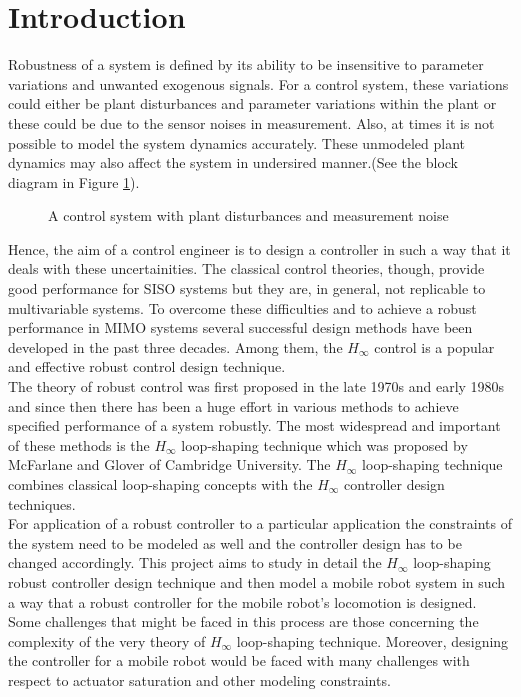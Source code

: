 \documentclass[a4paper,12pt]{article}
\begin{document}
\section{Introduction}
Robustness of a system is defined by its ability to be insensitive to parameter variations and unwanted exogenous signals. For a control system, these variations could either be plant disturbances and parameter variations within the plant or these could be due to the sensor noises in measurement. Also, at times it is not possible to model the system dynamics accurately. These unmodeled plant dynamics may also affect the system in undersired manner.(See the block diagram in Figure \ref{simple}).
		\begin{figure}[H]
 
			  \centering
			  
%			  
			  \def\svgscale{0.3}
			  \tiny{
			  
			  }
			  \caption{A control system with plant disturbances and measurement noise}
			 \label{simple}
		\end{figure} Hence, the aim of a control engineer is to design a controller in such a way that it deals with these uncertainities. The classical control theories, though, provide good performance for SISO systems but they are, in general, not replicable to multivariable systems. To overcome these
difficulties and to achieve a robust performance in MIMO systems several successful design methods have been developed in the past three decades. Among them, the $H_{\infty}$ control is a popular and effective robust control design technique.  \\
The theory of robust control was first proposed in the late 1970s and early 1980s and since then there has been a huge effort in various methods to achieve specified performance of a system robustly. The most widespread and important of these methods is the $H_{\infty}$ loop-shaping technique which was proposed by McFarlane and Glover of Cambridge University. The $H_{\infty}$ loop-shaping technique combines classical loop-shaping concepts with the $H_{\infty}$ controller design techniques.  \\
For application of a robust controller to a particular application the constraints of the system need to be modeled as well and the controller design has to be changed accordingly. This project aims to study in detail the $H_{\infty}$ loop-shaping robust controller design technique and then model a mobile robot system in such a way that a robust controller for the mobile robot's locomotion is designed. Some challenges that might be faced in this process are those concerning the complexity of the very theory of  $H_{\infty}$	 loop-shaping technique. Moreover, designing the controller for a mobile robot would be faced with many challenges with respect to actuator saturation and other modeling constraints.\\
\end{document}
